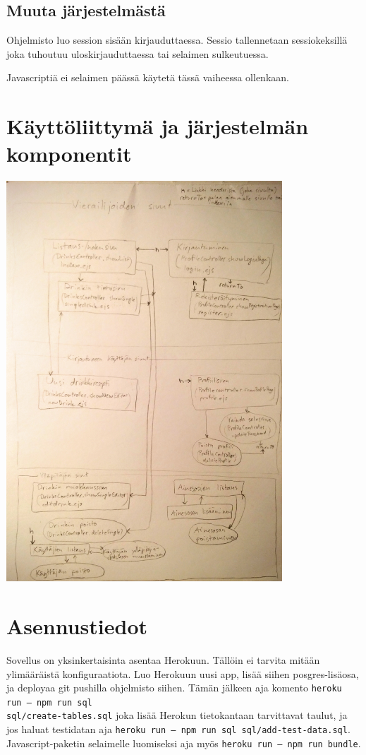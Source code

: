 \documentclass[a4paper]{article}
\begin{document}
\subsection{Muuta järjestelmästä}
Ohjelmisto luo session sisään kirjauduttaessa. Sessio tallennetaan sessiokeksillä joka tuhoutuu uloskirjauduttaessa tai selaimen sulkeutuessa.

Javascriptiä ei selaimen päässä käytetä tässä vaiheessa ollenkaan.

\section{Käyttöliittymä ja järjestelmän komponentit}
\includegraphics[width=\textwidth, height=15cm, keepaspectratio]{komponenttikaavio}

\section{Asennustiedot}
Sovellus on yksinkertaisinta asentaa Herokuun. Tällöin ei tarvita mitään ylimääräistä konfiguraatiota. Luo Herokuun uusi app, lisää siihen posgres-lisäosa, ja deployaa git pushilla ohjelmisto siihen. Tämän jälkeen aja komento \texttt{heroku run -- npm run sql \\ sql/create-tables.sql} joka lisää Herokun tietokantaan tarvittavat taulut, ja jos haluat testidatan aja \texttt{heroku run -- npm run sql sql/add-test-data.sql}. Javascript-paketin selaimelle luomiseksi aja myös \texttt{heroku run -- npm run bundle}.
\end{document}
